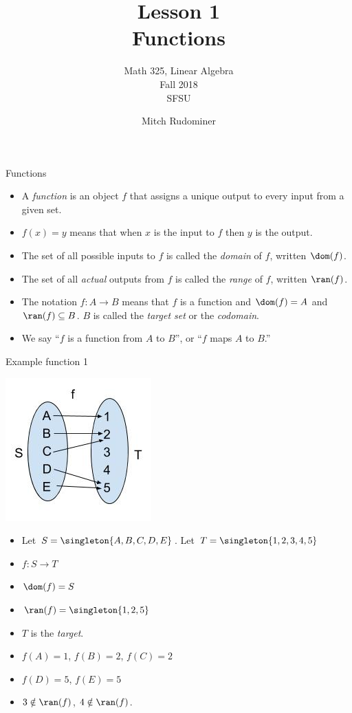 \documentclass{beamer}
\title{Lesson 1 \\ Functions}
\subtitle{Math 325, Linear Algebra \\ Fall 2018 \\ SFSU}
\author{Mitch Rudominer}
\date{}
\begin{document}
\begin{frame}
  \titlepage
\end{frame}


\begin{frame}{Functions}

  \begin{itemize}
  \item  A \emph{function} is an object $f$ that assigns a unique output
  to every input from a given set.
  \item $f(x) = y$ means that when $x$ is the input to $f$ then $y$ is the output.
  \item The set of all possible inputs to $f$ is called the \emph{domain} of $f$,
  written $\dom(f)$.
  \item The set of all \emph{actual} outputs from $f$ is called the \emph{range} of $f$,
  written $\ran(f)$.
  \item The notation $f:A \to B$ means that $f$ is a function and
  $\dom(f)=A$ and $\ran(f)\subseteq B$. $B$ is called the \emph{target set}
  or the \emph{codomain}.
  \item We say ``$f$ is a function from $A$ to $B$'', or ``$f$ maps $A$ to $B$.''
  \end{itemize}


\end{frame}

\begin{frame}{Example function 1}
\begin{center}
\includegraphics[scale=0.25]{function1}
\end{center}

\begin{itemize}
\item Let $S=\singleton{A,B,C,D,E}$. Let $T=\singleton{1,2,3,4,5}$
\item $f:S\to T$
\item $\dom(f) = S$
\item $\ran(f) = \singleton{1,2,5}$
\item $T$ is the \emph{target}.
\item $f(A) = 1$, $f(B) = 2$, $f(C)=2$
\item $f(D) = 5$, $f(E) = 5$
\item $3 \notin \ran(f)$, $4\notin\ran(f)$.
\end{itemize}
\end{frame}
\end{document}
